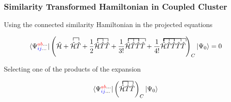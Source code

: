 \documentclass{beamer}
\begin{document}
\begin{frame}
\frametitle{Similarity Transformed Hamiltonian  in Coupled Cluster}



Using the connected similarity Hamiltonian in the projected equations


\[
\langle \Psi^{\textcolor{red}{ab}\ldots}_{\textcolor{blue}{ij}\ldots} |  \left(
 \hat{\mathcal{H}} +   \contraction{} { \hat{\mathcal{H}}}{}{ {\hat{T}}} 
  \hat{\mathcal{H}} \hat{T} + 
 \frac{1}{2}\contraction{}{ \bar{11}}{}{\bar{1}} 
    \contraction{} { \bar{11}}{1}{ {\hat{11}}} 
 \hat{\mathcal{H}} \hat{T} \hat{T}  +
\frac{1}{3!}  \contraction{}{ \bar{11}}{}{\bar{1}} 
    \contraction{} { \bar{11}}{1}{ {\hat{11}}} 
 \contraction{} { \bar{11}}{1}{ {\hat{11}}}
 \contraction{} { \bar{11}}{1}{ {\hat{111111}}}
\hat{\mathcal{H}} \hat{T} \hat{T} \hat{T}  +
\frac{1}{4!}  \contraction{}{ \bar{11}}{}{\bar{1}} 
    \contraction{} { \bar{11}}{1}{ {\hat{11}}} 
 \contraction{} { \bar{11}}{1}{ {\hat{11}}}
 \contraction{} { \bar{11}}{1}{ {\hat{111111}}}
 \contraction{} { \bar{11}}{1}{ {\hat{111111111}}}
\hat{\mathcal{H}} \hat{T} \hat{T} \hat{T}  \hat{T} 
 \right)_{C}| \Psi_{0} \rangle = 0
\]

Selecting one of the products of the expansion


\[
\langle \Psi^{\textcolor{red}{ab}\ldots}_{\textcolor{blue}{ij}\ldots} |  \left(
\contraction{}{ \bar{11}}{}{\bar{1}} 
    \contraction{} { \bar{11}}{1}{ {\hat{11}}} 
 \hat{\mathcal{H}} \hat{T} \hat{T} 
\right)_{C}| \Psi_{0} \rangle
\]







\end{frame}
\end{document}
